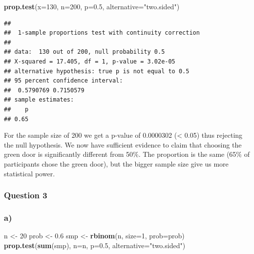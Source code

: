 \documentclass[
]{article}
\newenvironment{Shaded}{\begin{snugshade}}{\end{snugshade}}
\newcommand{\AttributeTok}[1]{\textcolor[rgb]{0.13,0.29,0.53}{#1}}
\newcommand{\DecValTok}[1]{\textcolor[rgb]{0.00,0.00,0.81}{#1}}
\newcommand{\FloatTok}[1]{\textcolor[rgb]{0.00,0.00,0.81}{#1}}
\newcommand{\FunctionTok}[1]{\textcolor[rgb]{0.13,0.29,0.53}{\textbf{#1}}}
\newcommand{\NormalTok}[1]{#1}
\newcommand{\OtherTok}[1]{\textcolor[rgb]{0.56,0.35,0.01}{#1}}
\newcommand{\StringTok}[1]{\textcolor[rgb]{0.31,0.60,0.02}{#1}}
\begin{document}
\begin{Shaded}
\begin{Highlighting}[]
\FunctionTok{prop.test}\NormalTok{(}\AttributeTok{x=}\DecValTok{130}\NormalTok{, }\AttributeTok{n=}\DecValTok{200}\NormalTok{, }\AttributeTok{p=}\FloatTok{0.5}\NormalTok{, }\AttributeTok{alternative=}\StringTok{"two.sided"}\NormalTok{)}
\end{Highlighting}
\end{Shaded}

\begin{verbatim}
## 
##  1-sample proportions test with continuity correction
## 
## data:  130 out of 200, null probability 0.5
## X-squared = 17.405, df = 1, p-value = 3.02e-05
## alternative hypothesis: true p is not equal to 0.5
## 95 percent confidence interval:
##  0.5790769 0.7150579
## sample estimates:
##    p 
## 0.65
\end{verbatim}

For the sample size of 200 we get a p-value of 0.0000302 (\textless{}
0.05) thus rejecting the null hypothesis. We now have sufficient
evidence to claim that choosing the green door is significantly
different from 50\%. The proportion is the same (65\% of participants
chose the green door), but the bigger sample size give us more
statistical power.

\subsubsection{Question 3}\label{question-3}

\subsubsection{a)}\label{a}

\begin{Shaded}
\begin{Highlighting}[]
\NormalTok{n }\OtherTok{\textless{}{-}} \DecValTok{20}
\NormalTok{prob }\OtherTok{\textless{}{-}} \FloatTok{0.6}
\NormalTok{smp }\OtherTok{\textless{}{-}} \FunctionTok{rbinom}\NormalTok{(n, }\AttributeTok{size=}\DecValTok{1}\NormalTok{, }\AttributeTok{prob=}\NormalTok{prob)}
\FunctionTok{prop.test}\NormalTok{(}\FunctionTok{sum}\NormalTok{(smp), }\AttributeTok{n=}\NormalTok{n, }\AttributeTok{p=}\FloatTok{0.5}\NormalTok{, }\AttributeTok{alternative=}\StringTok{"two.sided"}\NormalTok{)}
\end{Highlighting}
\end{Shaded}
\end{document}
